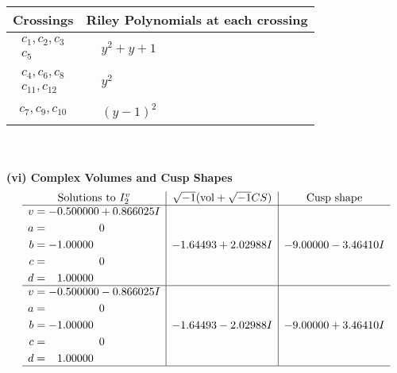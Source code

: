 \documentclass[1p]{elsarticle_modified}
\theoremstyle{definition}
\newcommand{\I}{\sqrt{-1}}
\begin{document}
\begin{tabular}{m{50pt}|m{274pt}}
Crossings & \hspace{64pt}Riley Polynomials at each crossing \\
\hline $$\begin{aligned}c_{1},c_{2},c_{3}\\c_{5}\end{aligned}$$&$\begin{aligned}
&y^2+y+1
\end{aligned}$\\
\hline $$\begin{aligned}c_{4},c_{6},c_{8}\\c_{11},c_{12}\end{aligned}$$&$\begin{aligned}
&y^2
\end{aligned}$\\
\hline $$\begin{aligned}c_{7},c_{9},c_{10}\end{aligned}$$&$\begin{aligned}
&(y-1)^2
\end{aligned}$\\
\hline
\end{tabular}\\~\\
\newpage\flushleft \textbf{(vi) Complex Volumes and Cusp Shapes}
$$\begin{array}{c|c|c}  
\text{Solutions to }I^v_{2}& \I (\text{vol} + \sqrt{-1}CS) & \text{Cusp shape}\\
 \hline 
\begin{aligned}
v &= -0.500000 + 0.866025 I \\
a &= \phantom{-0.000000 } 0 \\
b &= -1.00000\phantom{ +0.000000I} \\
c &= \phantom{-0.000000 } 0 \\
d &= \phantom{-}1.00000\phantom{ +0.000000I}\end{aligned}
 & -1.64493 + 2.02988 I & -9.00000 - 3.46410 I \\ \hline\begin{aligned}
v &= -0.500000 - 0.866025 I \\
a &= \phantom{-0.000000 } 0 \\
b &= -1.00000\phantom{ +0.000000I} \\
c &= \phantom{-0.000000 } 0 \\
d &= \phantom{-}1.00000\phantom{ +0.000000I}\end{aligned}
 & -1.64493 - 2.02988 I & -9.00000 + 3.46410 I\\
 \hline 
 \end{array}$$\newpage\newpage\renewcommand{\arraystretch}{1}
\end{document}
